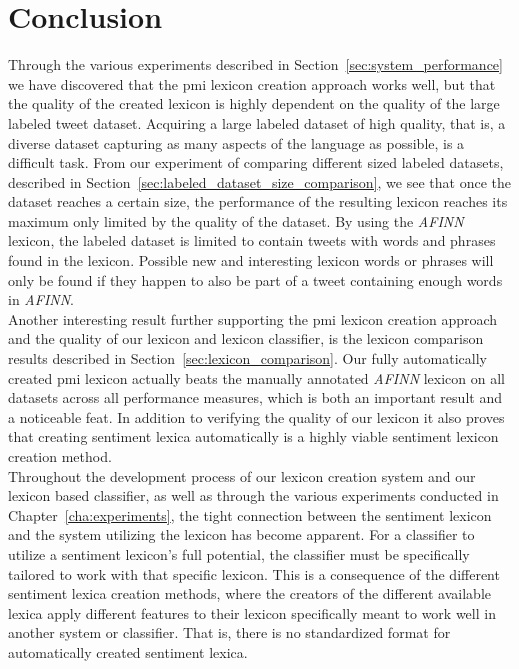 \section{Conclusion}
\label{sec:conclusion}
Through the various experiments described in Section~\ref{sec:system_performance} we have discovered that the \ac{pmi} lexicon creation approach works well, but that the quality of the created lexicon is highly dependent on the quality of the large labeled tweet dataset. Acquiring a large labeled dataset of high quality, that is, a diverse dataset capturing as many aspects of the language as possible, is a difficult task. From our experiment of comparing different sized labeled datasets, described in Section~\ref{sec:labeled_dataset_size_comparison}, we see that once the dataset reaches a certain size, the performance of the resulting lexicon reaches its maximum only limited by the quality of the dataset. By using the \textit{AFINN} lexicon, the labeled dataset is limited to contain tweets with words and phrases found in the lexicon. Possible new and interesting lexicon words or phrases will only be found if they happen to also be part of a tweet containing enough words in \textit{AFINN}. \\

Another interesting result further supporting the \ac{pmi} lexicon creation approach and the quality of our lexicon and lexicon classifier, is the lexicon comparison results described in Section~\ref{sec:lexicon_comparison}. Our fully automatically created \ac{pmi} lexicon actually beats the manually annotated \textit{AFINN} lexicon on all datasets across all performance measures, which is both an important result and a noticeable feat. In addition to verifying the quality of our lexicon it also proves that creating sentiment lexica automatically is a highly viable sentiment lexicon creation method. \\

Throughout the development process of our lexicon creation system and our lexicon based classifier, as well as through the various experiments conducted in Chapter~\ref{cha:experiments}, the tight connection between the sentiment lexicon and the system utilizing the lexicon has become apparent. For a classifier to utilize a sentiment lexicon's full potential, the classifier must be specifically tailored to work with that specific lexicon. This is a consequence of the different sentiment lexica creation methods, where the creators of the different available lexica apply different features to their lexicon specifically meant to work well in another system or classifier. That is, there is no standardized format for automatically created sentiment lexica. \\

